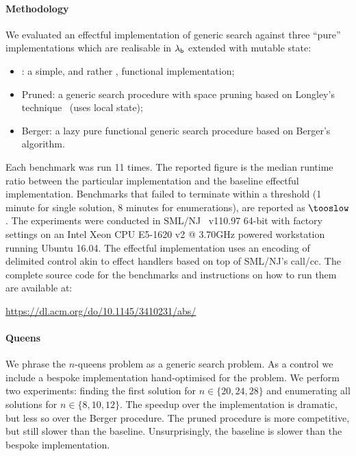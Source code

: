 \documentclass[12pt,phd,lfcs,twoside,openright,logo,leftchapter,normalheadings]{infthesis}
\theoremstyle{plain}
\theoremstyle{definition}
\begin{document}
\paragraph{Methodology}
We evaluated an effectful implementation of generic search against
three ``pure'' implementations which are realisable in $\lambda_{\mathsf{b}}$
extended with mutable state:
%
\begin{itemize}
\item \Naive: a simple, and rather \naive, functional implementation;
\item Pruned: a generic search procedure with space pruning based on
  Longley's technique~\cite{Longley99} (uses local state);
\item Berger: a lazy pure functional generic search procedure based on
  Berger's algorithm.
\end{itemize}
%
Each benchmark was run 11 times. The reported figure is the median
runtime ratio between the particular implementation and the baseline
effectful implementation. Benchmarks that failed to terminate within a
threshold (1 minute for single solution, 8 minutes for enumerations),
are reported as $\tooslow$. The experiments were conducted in
SML/NJ~\cite{AppelM91} v110.97 64-bit with factory settings on an Intel Xeon
CPU E5-1620 v2 @ 3.70GHz powered workstation running Ubuntu 16.04. The
effectful implementation uses an encoding of delimited control akin to
effect handlers based on top of SML/NJ's call/cc.
%
The complete source code for the benchmarks and instructions on how to
run them are available at:
\begin{center}
  \url{https://dl.acm.org/do/10.1145/3410231/abs/}
\end{center}
%

\paragraph{Queens}
We phrase the $n$-queens problem as a generic search problem. As a
control we include a bespoke implementation hand-optimised for the
problem. We perform two experiments: finding the first solution for $n
\in \{20,24,28\}$ and enumerating all solutions for $n \in
\{8,10,12\}$. The speedup over the \naive implementation is dramatic,
but less so over the Berger procedure. The pruned procedure is more
competitive, but still slower than the baseline. Unsurprisingly, the
baseline is slower than the bespoke implementation.
\end{document}
